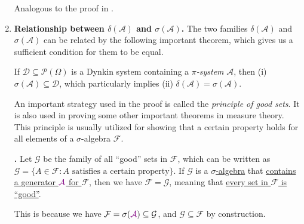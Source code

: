 \begin{enumerate}
\begin{pf}
Analogous to the proof in .
\end{pf}

\item \textbf{Relationship between \(\delta(\mathcal{A})\) and
\(\sigma(\mathcal{A})\).} The two families \(\delta(\mathcal{A})\) and
\(\sigma(\mathcal{A})\) can be related by the following important theorem,
which gives us a sufficient condition for them to be equal.
\begin{theorem}
\label{thm:dynkin-pi-lambda}
If \(\mathcal{D}\subseteq \mathcal{P}(\Omega)\) is a Dynkin system containing a
\emph{\(\pi\)-system} \(\mathcal{A}\), then (i) \(\sigma(\mathcal{A})\subseteq
\mathcal{D}\), which particularly implies (ii)
\(\delta(\mathcal{A})=\sigma(\mathcal{A})\).
\end{theorem}
An important strategy used in the proof is called the \emph{principle of good
sets}. It is also used in proving some other important theorems in measure
theory. This principle is usually utilized for showing that a certain property
holds for all elements of a \(\sigma\)-algebra \(\mathcal{F}\).

\textbf{.} Let \(\mathcal{G}\) be the family of
all ``good'' sets in \(\mathcal{F}\), which can be written as
\(\mathcal{G}=\{A\in\mathcal{F}:A\text{ satisfies a certain property}\}\). If
\(\mathcal{G}\) is a \underline{\(\sigma\)-algebra} that \underline{contains a
generator \(\vc{\mathcal{A}}\) for \(\mathcal{F}\)}, then we have
\(\mathcal{F}=\mathcal{G}\), meaning that \underline{every set in
\(\mathcal{F}\) is ``good''}.
\begin{note}
This is because we have \(\mathcal{F}=\sigma(\vc{\mathcal{A}})\subseteq
\mathcal{G}\), and \(\mathcal{G}\subseteq \mathcal{F}\) by construction.
\end{note}



\end{enumerate}
